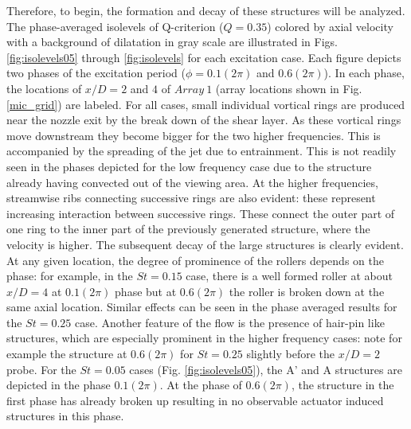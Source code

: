 \documentclass[english]{aiaa-tc}
\begin{document}
Therefore, to begin, the formation and decay of these structures will be analyzed. The phase-averaged isolevels of Q-criterion ($Q=0.35$) colored by axial velocity with a background of dilatation in gray scale are illustrated in Figs. \ref{fig:isolevels05} through \ref{fig:isolevels} for each excitation case. Each figure depicts two phases of the excitation period ($\phi =0.1(2\pi)$ and $0.6(2\pi)$). In each phase, the locations of $x/D=2$ and $4$ of $Array~1$ (array locations shown in Fig. \ref{mic_grid}) are labeled. 
For all cases, small individual vortical rings are produced near the
nozzle exit by the break down of the shear layer. As these vortical
rings move downstream they become bigger for the two higher
frequencies.  This is accompanied by the spreading of the jet due to
entrainment.  This is not readily seen in the phases depicted for the low frequency case due to the structure already having convected out of the viewing area. At the higher frequencies, streamwise ribs connecting
successive rings are also evident\cite{gdv2011-POF}: these represent
increasing interaction between successive rings.  These connect the
outer part of one ring to the inner part of the previously generated
structure, where the velocity is higher.  The subsequent decay of
the large structures is clearly evident.  At any given location, the
degree of prominence of the rollers depends on the phase: for example,
in the $St=0.15$ case, there is a well formed roller at about $x/D=4$ at
$0.1(2\pi)$ phase but at $0.6(2\pi)$ the roller is broken
down at the same axial location.  Similar effects can be seen in the
phase averaged results for the $St=0.25$ case. Another feature of the
flow is the presence of hair-pin like structures, which are especially
prominent in the higher frequency cases: note for example the
structure at $0.6(2\pi)$ for $St=0.25$ slightly before the $x/D=2$
probe.
For the $St=0.05$ cases (Fig. \ref{fig:isolevels05}), the A' and A structures are depicted in the phase $0.1(2\pi)$. At the phase of $0.6(2\pi)$, the structure in the first phase has already broken up resulting in no observable actuator induced structures in this phase. 
\end{document}
